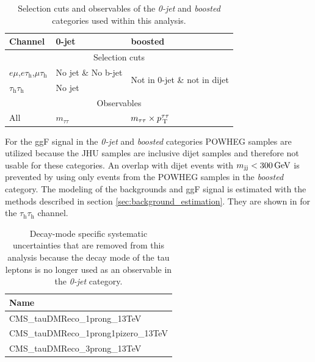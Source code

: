 \begin{table}[h]
    \centering
    \caption[Selection cuts \textit{0-jet} and \textit{boosted} categories.]{Selection cuts and observables of the \textit{0-jet} and \textit{boosted} categories used within this analysis.}\label{ES:categorization_0jet1jet}
    \begin{tabular}{lll}
        \toprule
        Channel         & 0-jet         & boosted    \\ \midrule
        \multicolumn{3}{c}{Selection cuts}                                                       \\ \hline
        $e\mu$,$e\tau_\text{h}$,$\mu\tau_\text{h}$           & No jet \& No b-jet  &  \multirow{2}{*}{Not in 0-jet \& not in dijet}        \\                
        $\tau_\text{h}\tau_\text{h}$  &  No jet                                 &          \\\midrule     
        \multicolumn{3}{c}{Observables}                                         \\ \midrule
        All          &  $m_{\tau\tau}$                            &  $m_{\tau\tau}\times p_\text{\,T}^{\tau\tau}$  \\  \bottomrule                                                                           
    \end{tabular}%
\end{table}%
For the ggF signal in the \textit{0-jet} and \textit{boosted} categories POWHEG samples are utilized because the JHU samples are inclusive dijet samples and therefore not usable for these categories. 
An overlap with dijet events with $m_\text{jj} < \text{300\,{GeV}}$ is prevented by using only events from the POWHEG samples in the \textit{boosted} category. 
The modeling of the backgrounds and ggF signal is estimated with the methods described in section \ref{sec:background_estimation}. They are shown in  for the  $\tau_\text{h}\tau_\text{h}$ channel.

\begin{table}[!]
    \centering
    \caption[Removed tau decay mode systematic uncertainties.]{Decay-mode specific systematic uncertainties that are removed from this analysis because the decay mode of the tau leptons is no longer
    used as an observable in the \textit{0-jet} category.}\label{tab:redundant} 
    \begin{tabular}{l}
        \toprule
        Name                        \\
        \midrule
        CMS\_tauDMReco\_1prong\_13TeV             \\
        CMS\_tauDMReco\_1prong1pizero\_13TeV        \\
        CMS\_tauDMReco\_3prong\_13TeV \\ \bottomrule
    \end{tabular}%
\end{table}%

